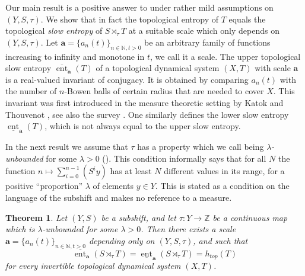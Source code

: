 \documentclass[a4paper,oneside]{amsart}
\renewcommand{\(}{\begin{dmath*}}
\renewcommand{\)}{\end{dmath*}}
\newtheorem{theorem}{Theorem}[section]
\theoremstyle{definition}
\newcommand{\N}{\mathbb{N}}
\newcommand{\Z}{\mathbb{Z}}
\newcommand{\upperent}{\overline{\operatorname{ent}}}
\newcommand{\lowerent}{\underline{\operatorname{ent}}}
\begin{document}
Our main result is a positive answer to  
under rather mild assumptions on $(Y,S,\tau)$. We show that in fact the topological entropy of $T$ equals the topological \textit{slow entropy} of $S\rtimes_\tau T$ at a suitable scale which only depends on $(Y,S,\tau)$. Let $\textbf{a}=\{a_n(t)\}_{n\in\N,t>0}$ be an arbitrary family of functions increasing to infinity and monotone in $t$,  we call it a scale. The upper topological slow entropy $\upperent_{\textbf{a}}(T)$ of a topological dynamical system $(X,T)$ with scale $\textbf{a}$ is a real-valued invariant of conjugacy. It is obtained by comparing $a_n(t)$ with the number of $n$-Bowen balls of certain radius that are needed to cover $X$. This invariant was first introduced in the measure theoretic setting by Katok and Thouvenot  \cite{AIHPB_1997__33_3_323_0}, see also the survey \cite{gogolev_survey_2024}. One similarly defines the lower slow entropy $\lowerent_{\textbf{a}}(T)$, which is not always equal to the upper slow entropy.


In the next result we assume that $\tau$ has a property which we call being \textit{$\lambda$-unbounded} for some $\lambda>0$ (). This condition informally says that for all $N$ the function $n\mapsto\sum_{i=0}^{n-1}(S^{i}y)$ has at least $N$ different values in its range, for a positive ``proportion'' $\lambda$ of elements $y\in Y$. This is stated as a condition on the language of the subshift and makes no reference to a measure. 

\begin{theorem}\label{thm:entropy}
Let $(Y,S)$ be a subshift, and let $\tau\colon Y\to \Z$ be a continuous map which is $\lambda$-unbounded for some $\lambda>0$. Then there exists a scale $\textbf{a}=\{a_n(t)\}_{n\in\N,t>0}$ depending only on $(Y,S,\tau)$, and such that
\[\upperent_{\textbf{a}}(S\rtimes_\tau T)=\lowerent_{\textbf{a}}(S\rtimes_\tau T)=h_{top}(T)\]  for every invertible topological dynamical system $(X,T)$.
\end{theorem} 
\end{document}
